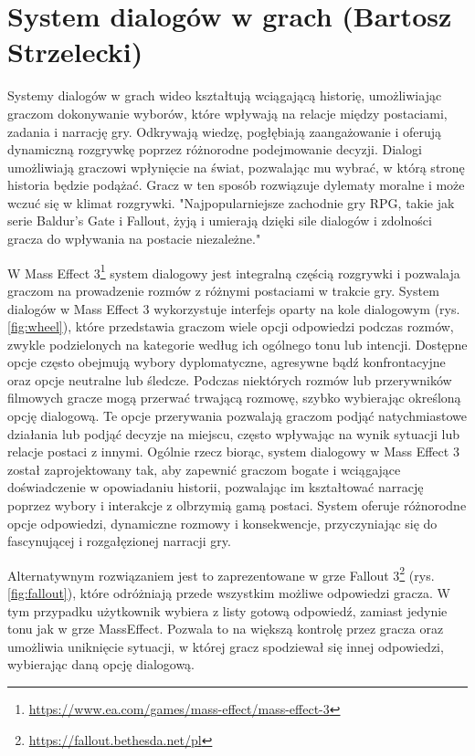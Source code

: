 \section{System dialogów w grach (Bartosz Strzelecki)}\label{chap:dialogi}
Systemy dialogów w grach wideo kształtują wciągającą historię, umożliwiając graczom dokonywanie wyborów, które wpływają na relacje między postaciami, zadania i narrację gry. 
Odkrywają wiedzę, pogłębiają zaangażowanie i oferują dynamiczną rozgrywkę poprzez różnorodne podejmowanie decyzji.
Dialogi umożliwiają graczowi wpłynięcie na świat, pozwalając mu wybrać, w którą stronę historia będzie podążać.
Gracz w ten sposób rozwiązuje dylematy moralne i może wczuć się w klimat rozgrywki.
"Najpopularniejsze zachodnie gry RPG, takie jak serie Baldur's Gate i Fallout, żyją i umierają dzięki sile dialogów i zdolności gracza do wpływania na postacie niezależne."\cite{dialogue}

W Mass Effect 3\footnote{\url{https://www.ea.com/games/mass-effect/mass-effect-3}} system dialogowy jest integralną częścią rozgrywki i pozwalaja graczom na prowadzenie rozmów z różnymi postaciami w trakcie gry.
System dialogów w Mass Effect 3 wykorzystuje interfejs oparty na kole dialogowym (rys. \ref{fig:wheel}), które
przedstawia graczom wiele opcji odpowiedzi podczas rozmów, zwykle podzielonych na kategorie według ich ogólnego tonu lub intencji.
Dostępne opcje często obejmują wybory dyplomatyczne, agresywne bądź konfrontacyjne oraz opcje neutralne lub śledcze.
Podczas niektórych rozmów lub przerywników filmowych gracze mogą przerwać trwającą rozmowę, szybko wybierając określoną opcję dialogową.
Te opcje przerywania pozwalają graczom podjąć natychmiastowe działania lub podjąć decyzje na miejscu, często wpływając na wynik sytuacji lub relacje postaci z innymi.
Ogólnie rzecz biorąc, system dialogowy w Mass Effect 3 został zaprojektowany tak, aby zapewnić graczom bogate i wciągające doświadczenie w opowiadaniu historii,
pozwalając im kształtować narrację poprzez wybory i interakcje z olbrzymią gamą postaci. System oferuje różnorodne opcje odpowiedzi, dynamiczne rozmowy i konsekwencje,
przyczyniając się do fascynującej i rozgałęzionej narracji gry.

Alternatywnym rozwiązaniem jest to zaprezentowane w grze Fallout 3\footnote{\url{https://fallout.bethesda.net/pl}} (rys. \ref{fig:fallout}), które odróżniają przede wszystkim możliwe odpowiedzi gracza.
W tym przypadku użytkownik wybiera z listy gotową odpowiedź, zamiast jedynie tonu jak w grze MassEffect. Pozwala to na większą kontrolę
przez gracza oraz umożliwia uniknięcie sytuacji, w której gracz spodziewał się innej odpowiedzi, wybierając daną opcję dialogową.

